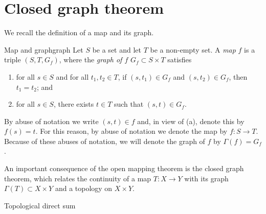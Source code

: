 \section{Closed graph theorem}
We recall the definition of a map and its graph.
\begin{definition}{Map and graph}{graph}
    Let \(S\) be a set and let \(T\) be a non-empty set. A \emph{map} \(f\) is a triple \((S, T, G_f)\), where the \emph{graph of \(f\)} \(G_f \subset S \times T\) satisfies
    \begin{enumerate}[label=(\alph*)]
        \item for all \(s \in S\) and for all \(t_1, t_2 \in T\), if \((s, t_1) \in G_f\) and \((s, t_2) \in G_f\), then \(t_1 = t_2\); and
        \item for all \(s \in S\), there exists \(t \in T\) such that \((s, t) \in G_f\).
    \end{enumerate}
    By abuse of notation we write \((s, t) \in f\) and, in view of (a), denote this by \(f(s) = t\). For this reason, by abuse of notation we denote the map by \(f : S \to T\). Because of these abuses of notation, we will denote the graph of \(f\) by \(\Gamma(f) = G_f\).
\end{definition}

An important consequence of the open mapping theorem is the closed graph theorem, which relates the continuity of a map \(T : X \to Y\) with its graph \(\Gamma(T)\subset X \times Y\) and a topology on \(X \times Y\).

\begin{definition}{Topological direct sum}{}

\end{definition}
